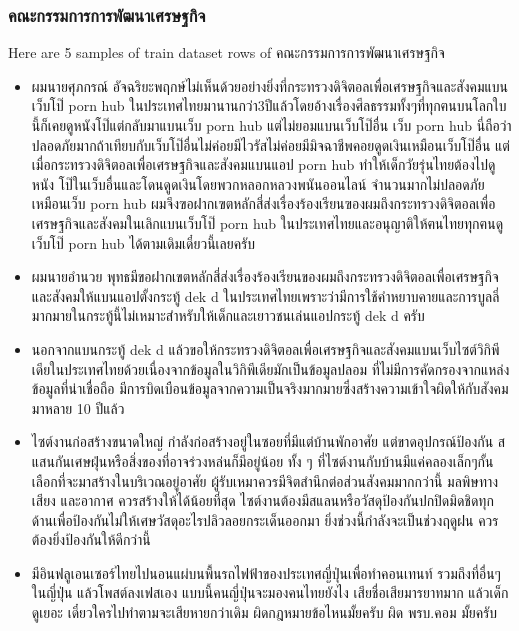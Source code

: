 \documentclass[12pt, a4paper]{article}
\begin{document}
                \subsubsection{คณะกรรมการการพัฒนาเศรษฐกิจ}
                    Here are 5 samples of train dataset rows of คณะกรรมการการพัฒนาเศรษฐกิจ
                    \begin{itemize}
                        \item ผมนายศุภกรณ์ อัจฉริยะพฤกษ์ไม่เห็นด้วยอย่างยิ่งที่กระทรวงดิจิตอลเพื่อเศรษฐกิจและสังคมแบนเว็บโป๊ porn hub
                        ในประเทศไทยมานานกว่า3ปีแล้วโดยอ้างเรื่องศีลธรรมทั้งๆที่ทุกฅนบนโลกใบนี้ก็เคยดูหนังโป๊แต่กลับมาแบนเว็บ porn hub
                        แต่ไม่ยอมแบนเว็บโป๊อื่น เว็บ porn hub นี่ถือว่าปลอดภัยมากถ้าเทียบกับเว็บโป๊อื่นไม่ค่อยมีไวรัสไม่ค่อยมีมิจฉาชีพคอยดูดเงินเหมือนเว็บโป๊อื่น
                        แต่เมื่อกระทรวงดิจิตอลเพื่อเศรษฐกิจและสังคมแบนแอป porn hub ทำให้เด็กวัยรุ่นไทยต้องไปดูหนัง โป๊ในเว็บอื่นและโดนดูดเงินโดยพวกหลอกหลวงพนันออนไลน์
                        จำนวนมากไม่ปลอดภัยเหมือนเว็บ porn hub  ผมจึงฃอฝากเฃตหลักสี่ส่งเรื่องร้องเรียนฃองผมถึงกระทรวงดิจิตอลเพื่อเศรษฐกิจและสังคมในเลิกแบนเว็บโป๊ porn hub
                        ในประเทศไทยและอนุญาติให้ฅนไทยทุกฅนดูเว็บโป๊ porn hub ได้ตามเดิมเดี๋ยวนี้เลยครับ
                        \item ผมนายอำนวย พุทธมีขอฝากเขตหลักสี่ส่งเรื่องร้องเรียนของผมถึงกระทรวงดิจิตอลเพื่อเศรษฐกิจและสังคมให้แบนแอปตั้งกระทู้ dek d
                        ในประเทศไทยเพราะว่ามีการใช้คำหยาบคายและการบูลลี่มากมายในกระทู้นี้ไม่เหมาะสำหรับให้เด็กและเยาวชนเล่นแอปกระทู้ dek d ครับ
                        \item นอกจากแบนกระทู้ dek d แล้วขอให้กระทรวงดิจิตอลเพื่อเศรษฐกิจและสังคมแบนเว็บไซต์วิกิพีเดียในประเทศไทยด้วยเนื่องจากข้อมูลในวิกิพีเดียมักเป็นข้อมูลปลอม
                        ที่ไม่มีการคัดกรองจากแหล่งข้อมูลที่น่าเชื่อถือ มีการบิดเบือนข้อมูลจากความเป็นจริงมากมายซึ่งสร้างความเข้าใจผิดให้กับสังคมมาหลาย 10 ปีแล้ว
                        \item ไซต์งานก่อสร้างขนาดใหญ่ กำลังก่อสร้างอยู่ในซอยที่มีแต่บ้านพักอาศัย แต่ขาดอุปกรณ์ป้องกัน สแสนกันเศษฝุ่นหรือสิ่งของที่อาจร่วงหล่นก็มีอยู่น้อย
                        ทั้ง ๆ ที่ไซต์งานกับบ้านมีแค่คลองเล็กๆกั้น เลือกที่จะมาสร้างในบริเวณอยู่อาศัย ผู้รับเหมาควรมีจิตสำนึกต่อส่วนสังคมมากกว่านี้ มลพิษทางเสียง
                        และอากาศ ควรสร้างให้ได้น้อยที่สุด ไซต์งานต้องมีสแลนหรือวัสดุป้องกันปกปิดมิดชิดทุกด้านเพื่อป้องกันไม่ให้เศษวัสดุอะไรปลิวลอยกระเด็นออกมา 
                        ยิ่งช่วงนี้กำลังจะเป็นช่วงฤดูฝน ควรต้องยิ่งป้องกันให้ดีกว่านี้
                        \item มีอินฟลูเอนเซอร์ไทยไปนอนแผ่บนพื้นรถไฟฟ้าของประเทศญี่ปุ่นเพื่อทำคอนเทนท์ รวมถึงที่อื่นๆในญี่ปุ่น แล้วโพสต์ลงเฟสเอง แบบนี้คนญี่ปุ่นจะมองคนไทยยังไง
                        เสียชื่อเสียมารยาทมาก แล้วเด็กดูเยอะ เดี๋ยวใครไปทำตามจะเสียหายกว่าเดิม ผิดกฎหมายข้อไหนมั้ยครับ ผิด พรบ.คอม มั้ยครับ
                    \end{itemize}
\end{document}
